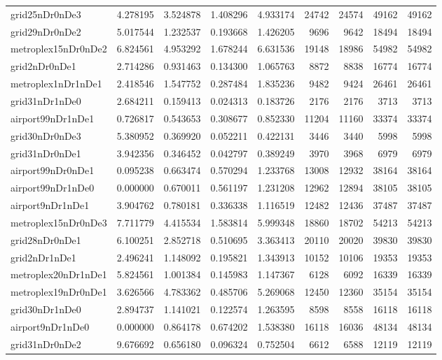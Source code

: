 \begin{longtable}{|l|r|r|r|r|r|r|r|r|}
grid25nDr0nDe3 & 4.278195 & 3.524878 & 1.408296 & 4.933174 & 24742 & 24574 & 49162 & 49162 \\
grid29nDr0nDe2 & 5.017544 & 1.232537 & 0.193668 & 1.426205 & 9696 & 9642 & 18494 & 18494 \\
metroplex15nDr0nDe2 & 6.824561 & 4.953292 & 1.678244 & 6.631536 & 19148 & 18986 & 54982 & 54982 \\
grid2nDr0nDe1 & 2.714286 & 0.931463 & 0.134300 & 1.065763 & 8872 & 8838 & 16774 & 16774 \\
metroplex1nDr1nDe1 & 2.418546 & 1.547752 & 0.287484 & 1.835236 & 9482 & 9424 & 26461 & 26461 \\
grid31nDr1nDe0 & 2.684211 & 0.159413 & 0.024313 & 0.183726 & 2176 & 2176 & 3713 & 3713 \\
airport99nDr1nDe1 & 0.726817 & 0.543653 & 0.308677 & 0.852330 & 11204 & 11160 & 33374 & 33374 \\
grid30nDr0nDe3 & 5.380952 & 0.369920 & 0.052211 & 0.422131 & 3446 & 3440 & 5998 & 5998 \\
grid31nDr0nDe1 & 3.942356 & 0.346452 & 0.042797 & 0.389249 & 3970 & 3968 & 6979 & 6979 \\
airport99nDr0nDe1 & 0.095238 & 0.663474 & 0.570294 & 1.233768 & 13008 & 12932 & 38164 & 38164 \\
airport99nDr1nDe0 & 0.000000 & 0.670011 & 0.561197 & 1.231208 & 12962 & 12894 & 38105 & 38105 \\
airport9nDr1nDe1 & 3.904762 & 0.780181 & 0.336338 & 1.116519 & 12482 & 12436 & 37487 & 37487 \\
metroplex15nDr0nDe3 & 7.711779 & 4.415534 & 1.583814 & 5.999348 & 18860 & 18702 & 54213 & 54213 \\
grid28nDr0nDe1 & 6.100251 & 2.852718 & 0.510695 & 3.363413 & 20110 & 20020 & 39830 & 39830 \\
grid2nDr1nDe1 & 2.496241 & 1.148092 & 0.195821 & 1.343913 & 10152 & 10106 & 19353 & 19353 \\
metroplex20nDr1nDe1 & 5.824561 & 1.001384 & 0.145983 & 1.147367 & 6128 & 6092 & 16339 & 16339 \\
metroplex19nDr0nDe1 & 3.626566 & 4.783362 & 0.485706 & 5.269068 & 12450 & 12360 & 35154 & 35154 \\
grid30nDr1nDe0 & 2.894737 & 1.141021 & 0.122574 & 1.263595 & 8598 & 8558 & 16118 & 16118 \\
airport9nDr1nDe0 & 0.000000 & 0.864178 & 0.674202 & 1.538380 & 16118 & 16036 & 48134 & 48134 \\
grid31nDr0nDe2 & 9.676692 & 0.656180 & 0.096324 & 0.752504 & 6612 & 6588 & 12119 & 12119 \\

\end{longtable}
